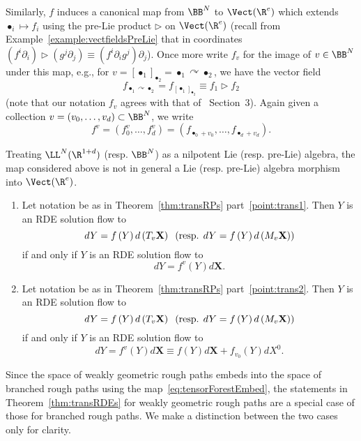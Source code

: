 \documentclass{article}
\begin{document}
Similarly, $f$ induces a canonical map from $\BB^N$ to $\Vect(\R^e)$ which extends $\bullet _{i}\mapsto f_{i}$ using the pre-Lie product $\triangleright$ on $\Vect(\R^e)$ (recall from Example~\ref{example:vectfieldsPreLie} that in coordinates $\left( f^{i}\partial_{i}\right) \triangleright \left( g^{j}\partial _{j}\right) \equiv \left(f^{i}\partial _{i}g^{j}\right) \partial _{j}$). Once more write $f_{v}$ for
the image of $v\in \BB^N$ under this map, e.g., for $v = \left[ \bullet_{1} \right]_{\bullet_2} = \bullet_1 \curvearrowright \bullet_2$, we have the vector field
\[
f_{\bullet _{1}\curvearrowright \bullet _{2}} = f_{\left[ \bullet _{1} \right] _{\bullet_2}} \equiv f_{1}\triangleright f_{2}
\]
(note that our notation $f_v$ agrees with that of~\cite{HairerKelly15} Section~3). Again given a collection $v = (v_0,\ldots, v_d) \subset \BB^N$, we write
\[
f^v = (f^v_0,\ldots, f^v_d) = (f_{\bullet_0 + v_0},\ldots, f_{\bullet_d + v_d}).
\]

\begin{remark}
Treating $\LL^N(\R^{1+d})$ (resp. $\BB^N$) as a nilpotent Lie (resp. pre-Lie) algebra, the map considered above is not in general a Lie (resp. pre-Lie) algebra morphism into $\Vect(\R^e)$.
\end{remark}


\begin{theorem}\label{thm:transRDEs}
\begin{enumerate}[label=\upshape(\roman*\upshape)]
\item \label{point:RDE1} Let notation be as in Theorem~\ref{thm:transRPs} part~\ref{point:trans1}. Then $Y$ is an RDE solution flow to     
\[
dY=f\left( Y\right) d\left( T_{v}\mathbf{X}\right) \; \; (\textnormal{resp. } dY=f\left( Y\right) d\left( M_{v}\mathbf{X}\right) )
\]%
if and only if $Y$ is an RDE solution flow to  
\[
dY= f^v\left( Y\right) d\mathbf{X}.
\]

\item \label{point:RDE2}  Let notation be as in Theorem~\ref{thm:transRPs} part~\ref{point:trans2}. Then $Y$ is an RDE solution flow to 
\[
dY=f\left( Y\right) d\left( T_{v}\mathbf{X}\right) \; \; (\textnormal{resp. } dY=f\left( Y\right) d\left( M_{v}\mathbf{X}\right) )
\]%
if and only if $Y$ is an RDE solution flow to 
\[
dY= f^v(Y)d\mathbf{X} \equiv f\left( Y\right) d\mathbf{X}+f_{v_{0}}\left( Y\right) dX^{0}.
\]%
\end{enumerate} 
\end{theorem}

\begin{remark}\label{remark:geobranchEmbed}
Since the space of weakly geometric rough paths embeds into the space of branched rough paths using the map~\eqref{eq:tensorForestEmbed}, the statements in Theorem~\ref{thm:transRDEs} for weakly geometric rough paths are a special case of those for branched rough paths. We make a distinction between the two cases only for clarity.
\end{remark}
\end{document}
